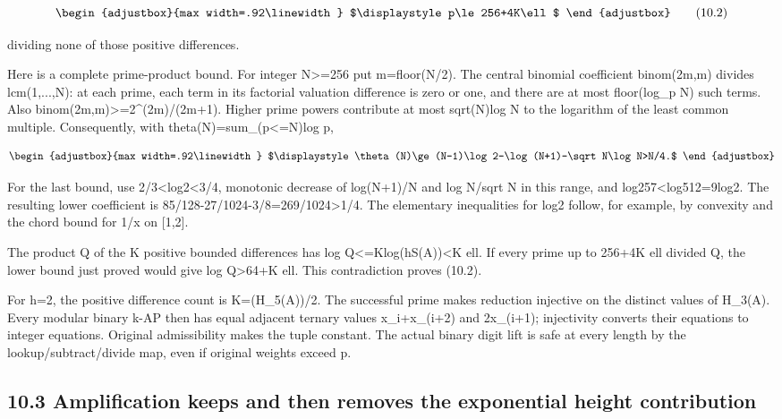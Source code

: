 \[
\begin{adjustbox}{max width=.92\linewidth}
$\displaystyle p\le256+4K\ell$
\end{adjustbox}
\tag{10.2}
\]

dividing none of those positive differences.

Here is a complete prime-product bound. For integer N\textgreater=256 put m=floor(N/2). The central binomial coefficient binom(2m,m) divides lcm(1,...,N): at each prime, each term in its factorial valuation difference is zero or one, and there are at most floor(log\_p N) such terms. Also binom(2m,m)\textgreater=2\^{}(2m)/(2m+1). Higher prime powers contribute at most sqrt(N)log N to the logarithm of the least common multiple. Consequently, with theta(N)=sum\_(p\textless=N)log p,

\[
\begin{adjustbox}{max width=.92\linewidth}
$\displaystyle \theta(N)\ge (N-1)\log2-\log(N+1)-\sqrt N\log N>N/4.$
\end{adjustbox}
\]

For the last bound, use 2/3\textless log2\textless3/4, monotonic decrease of log(N+1)/N and log N/sqrt N in this range, and log257\textless log512=9log2. The resulting lower coefficient is 85/128-27/1024-3/8=269/1024\textgreater1/4. The elementary inequalities for log2 follow, for example, by convexity and the chord bound for 1/x on {[}1,2{]}.

The product Q of the K positive bounded differences has log Q\textless=Klog(hS(A))\textless K ell. If every prime up to 256+4K ell divided Q, the lower bound just proved would give log Q\textgreater64+K ell. This contradiction proves (10.2).

For h=2, the positive difference count is K=(\textbar H\_5(A))/2. The successful prime makes reduction injective on the distinct values of H\_3(A). Every modular binary k-AP then has equal adjacent ternary values x\_i+x\_(i+2) and 2x\_(i+1); injectivity converts their equations to integer equations. Original admissibility makes the tuple constant. The actual binary digit lift is safe at every length by the lookup/subtract/divide map, even if original weights exceed p.

\subsection{10.3 Amplification keeps and then removes the exponential height contribution}\label{n24-amplification-keeps-and-then-removes-the-exponential-height-contribution}

